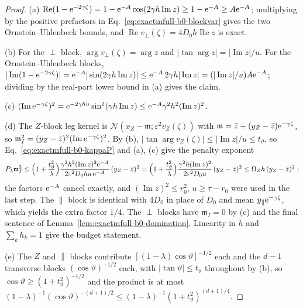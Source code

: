 \begin{proof}
(a) \(\operatorname{Re}(1-\mathrm e^{-2\gamma\zeta})
=1-\mathrm e^{-A}\cos(2\gamma h\operatorname{Im}z)\ge1-\mathrm e^{-A}\ge A\mathrm e^{-A}\);
multiplying by the positive prefactors in
Eq.~\eqref{eq:exactmfull-b0-blockvar} gives the two
Ornstein--Uhlenbeck bounds, and
\(\operatorname{Re}v_\perp(\zeta)=4D_0h\operatorname{Re}z\) is exact.

(b) For the \(\perp\) block, \(\arg v_\perp(\zeta)=\arg z\) and
\(|\tan\arg z|=|\operatorname{Im}z|/u\).  For the Ornstein--Uhlenbeck
blocks,
\(|\operatorname{Im}(1-\mathrm e^{-2\gamma\zeta})|
=\mathrm e^{-A}|\sin(2\gamma h\operatorname{Im}z)|
\le\mathrm e^{-A}\,2\gamma h|\operatorname{Im}z|
=(|\operatorname{Im}z|/u)A\mathrm e^{-A}\); dividing by the real-part lower bound
in (a) gives the claim.

(c) \((\operatorname{Im}\mathrm e^{-\gamma\zeta})^2
=\mathrm e^{-2\gamma hu}\sin^2(\gamma h\operatorname{Im}z)
\le\mathrm e^{-A}\gamma^2h^2(\operatorname{Im}z)^2\).

(d) The \(Z\)-block leg kernel is
\(\mathcal N(x_Z-\mathfrak m;\varepsilon^2v_Z(\zeta))\) with
\(\mathfrak m=\bar z+(y_Z-\bar z)\mathrm e^{-\gamma\zeta}\), so
\(\mathfrak m_I^2=(y_Z-\bar z)^2(\operatorname{Im}\mathrm e^{-\gamma\zeta})^2\).
By (b), \(|\tan\arg v_Z(\zeta)|\le|\operatorname{Im}z|/u\le t_\vartheta\),
so Eq.~\eqref{eq:exactmfull-b0-kappaP} and (a), (c) give the penalty
exponent
\begin{equation*}
 P_\lambda\mathfrak m_I^2
 \le\Bigl(1+\frac{t_\vartheta^2}{\lambda}\Bigr)
 \frac{\gamma^2h^2(\operatorname{Im}z)^2\mathrm e^{-A}}
      {2\varepsilon^2D_0hu\,\mathrm e^{-A}}\,(y_Z-\bar z)^2
 =\Bigl(1+\frac{t_\vartheta^2}{\lambda}\Bigr)
 \frac{\gamma^2h(\operatorname{Im}z)^2}{2\varepsilon^2D_0u}\,
 (y_Z-\bar z)^2
 \le\Omega_Zh\,(y_Z-\bar z)^2:
\end{equation*}
the factors \(\mathrm e^{-A}\) cancel exactly, and
\((\operatorname{Im}z)^2\le r_0^2\), \(u\ge\tau-r_0\) were used in the last
step.  The \(\parallel\) block is identical with \(4D_0\) in place of
\(D_0\) and mean \(y_\parallel\mathrm e^{-\gamma\zeta}\), which yields the extra
factor \(1/4\).  The \(\perp\) blocks have \(\mathfrak m_I=0\) by (c) and
the final sentence of Lemma~\ref{lem:exactmfull-b0-domination}.  Linearity
in \(h\) and \(\sum_kh_k=1\) give the budget statement.

(e) The \(Z\) and \(\parallel\) blocks contribute
\([(1-\lambda)\cos\vartheta]^{-1/2}\) each and the \(d-1\) transverse
blocks \((\cos\vartheta)^{-1/2}\) each, with
\(|\tan\vartheta|\le t_\vartheta\) throughout by (b), so
\(\cos\vartheta\ge(1+t_\vartheta^2)^{-1/2}\) and the product is at most
\((1-\lambda)^{-1}(\cos\vartheta)^{-(d+1)/2}
\le(1-\lambda)^{-1}(1+t_\vartheta^2)^{(d+1)/4}\).
\end{proof}

